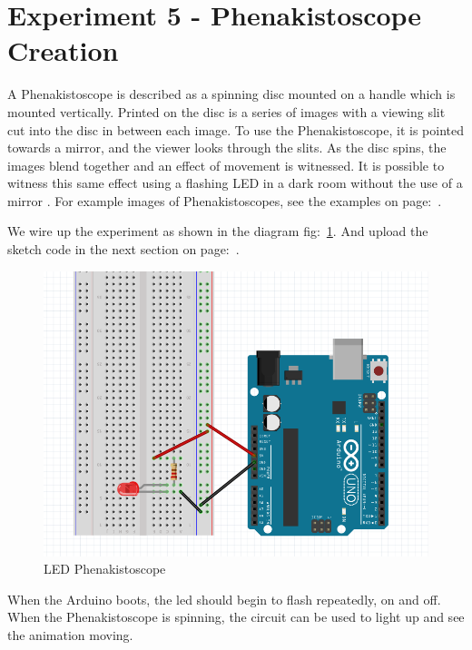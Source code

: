 \chapter*{Experiment 5 - Phenakistoscope Creation}
A Phenakistoscope is described as a spinning disc mounted on a handle which is mounted vertically. Printed on the disc is a series of images with a viewing slit cut into the disc in between each image. To use the Phenakistoscope, it is pointed towards a mirror, and the viewer looks through the slits. As the disc spins, the images blend together and an effect of movement is witnessed. It is possible to witness this same effect using a flashing LED in a dark room without the use of a mirror \citep{kalif-15-a} \citep{kalif-15-b} \cite{pepi-11}. For example images of Phenakistoscopes, see the examples on page:~\pageref{fig:phenakistoscopes}.

We wire up the experiment as shown in the diagram fig:~\ref{fig:exp5_phenakistoscope}. And upload the sketch code in the next section on page:~\pageref{sketch:exp5}.

%
\begin{figure}[ht]
	\centering
	\includegraphics[width=12cm]{images/07}
	\caption{LED Phenakistoscope \citep{fritzing-15}}
	\label{fig:exp5_phenakistoscope}
\end{figure}
%

When the Arduino boots, the led should begin to flash repeatedly, on and off. When the \gls{Phenakistoscope} is spinning, the circuit can be used to light up and see the animation moving.

